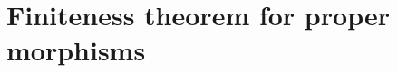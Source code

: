 \section{Finiteness theorem for proper morphisms}
\label{section:finiteness-theorem-for-proper-morphisms}

